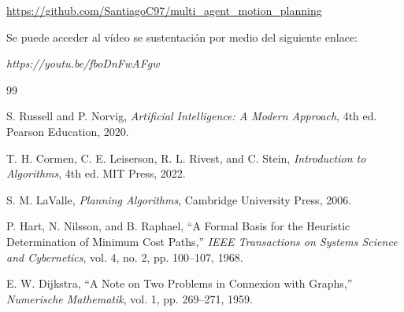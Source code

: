 \documentclass[12pt,a4paper]{article}
\begin{document}
\begin{center}
\url{https://github.com/SantiagoC97/multi_agent_motion_planning}
\end{center}

Se puede acceder al vídeo se sustentación por medio del siguiente enlace:

\begin{center}
\textit{https://youtu.be/fboDnFwAFgw}
\end{center}

\begin{thebibliography}{99}

S. Russell and P. Norvig,
\textit{Artificial Intelligence: A Modern Approach},
4th ed. Pearson Education, 2020.

T. H. Cormen, C. E. Leiserson, R. L. Rivest, and C. Stein,
\textit{Introduction to Algorithms},
4th ed. MIT Press, 2022.

S. M. LaValle,
\textit{Planning Algorithms},
Cambridge University Press, 2006.

P. Hart, N. Nilsson, and B. Raphael,
``A Formal Basis for the Heuristic Determination of Minimum Cost Paths,''
\textit{IEEE Transactions on Systems Science and Cybernetics},
vol. 4, no. 2, pp. 100--107, 1968.

E. W. Dijkstra,
``A Note on Two Problems in Connexion with Graphs,''
\textit{Numerische Mathematik},
vol. 1, pp. 269--271, 1959.

\end{thebibliography}
\end{document}
